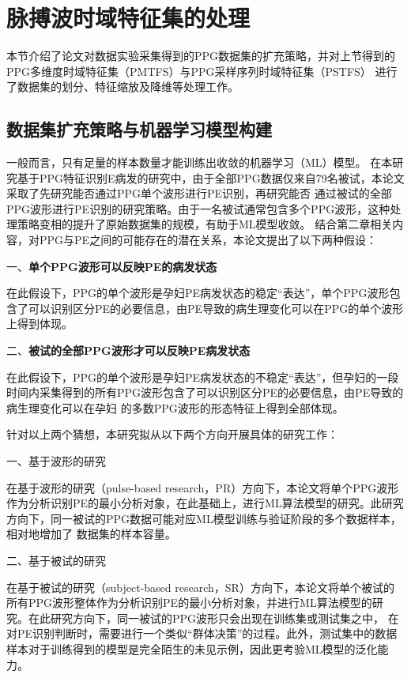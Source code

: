 \section{脉搏波时域特征集的处理}

本节介绍了论文对数据实验采集得到的PPG数据集的扩充策略，并对上节得到的PPG多维度时域特征集（PMTFS）与PPG采样序列时域特征集（PSTFS）
进行了数据集的划分、特征缩放及降维等处理工作。

\subsection{数据集扩充策略与机器学习模型构建}
一般而言，只有足量的样本数量才能训练出收敛的机器学习（ML）模型。
在本研究基于PPG特征识别E病发的研究中，由于全部PPG数据仅来自79名被试，本论文采取了先研究能否通过PPG单个波形进行PE识别，再研究能否
通过被试的全部PPG波形进行PE识别的研究策略。由于一名被试通常包含多个PPG波形，这种处理策略变相的提升了原始数据集的规模，有助于ML模型收敛。
结合第二章相关内容，对PPG与PE之间的可能存在的潜在关系，本论文提出了以下两种假设：

一、\textbf{单个PPG波形可以反映PE的病发状态}

在此假设下，PPG的单个波形是孕妇PE病发状态的稳定“表达”，单个PPG波形包含了可以识别区分PE的必要信息，由PE导致的病生理变化可以在PPG的单个波形上得到体现。

二、\textbf{被试的全部PPG波形才可以反映PE病发状态}

在此假设下，PPG的单个波形是孕妇PE病发状态的不稳定“表达”，但孕妇的一段时间内采集得到的所有PPG波形包含了可以识别区分PE的必要信息，由PE导致的病生理变化可以在孕妇
的多数PPG波形的形态特征上得到全部体现。

针对以上两个猜想，本研究拟从以下两个方向开展具体的研究工作：

一、基于波形的研究

在基于波形的研究（pulse-based research，PR）方向下，本论文将单个PPG波形作为分析识别PE的最小分析对象，在此基础上，进行ML算法模型的研究。此研究方向下，同一被试的PPG数据可能对应ML模型训练与验证阶段的多个数据样本，相对地增加了
数据集的样本容量。

二、基于被试的研究

在基于被试的研究（subject-based research，SR）方向下，本论文将单个被试的所有PPG波形整体作为分析识别PE的最小分析对象，并进行ML算法模型的研究。在此研究方向下，同一被试的PPG波形只会出现在训练集或测试集之中，
在对PE识别判断时，需要进行一个类似“群体决策”的过程。此外，测试集中的数据样本对于训练得到的模型是完全陌生的未见示例，因此更考验ML模型的泛化能力。

